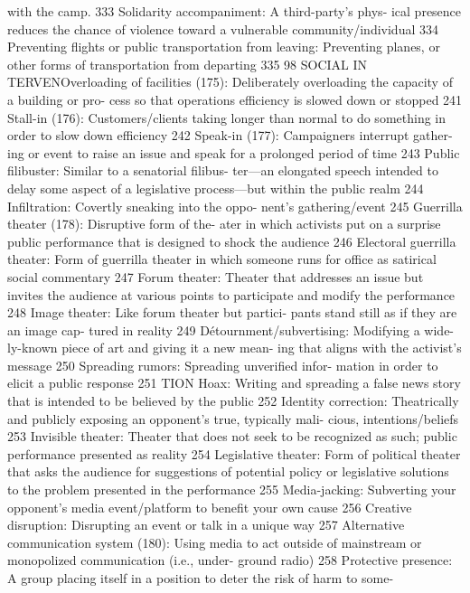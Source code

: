 \documentclass[twoside,a4paper,12pt,fleqn,openany]{extbook}
\begin{document}
with the camp.
 333
Solidarity accompaniment: A third-party’s phys-
ical presence reduces the chance of violence
toward a vulnerable community/individual 334
Preventing flights or public transportation
from leaving: Preventing planes, or other forms
of transportation from departing
 335
98
SOCIAL IN TERVENOverloading of facilities (175): Deliberately
overloading the capacity of a building or pro-
cess so that operations efficiency is slowed
down or stopped
 241
Stall-in (176): Customers/clients taking longer
than normal to do something in order to slow
down efficiency
 242
Speak-in (177): Campaigners interrupt gather-
ing or event to raise an issue and speak for a
prolonged period of time
 243
Public filibuster: Similar to a senatorial filibus-
ter—an elongated speech intended to delay
some aspect of a legislative process—but
within the public realm
 244
Infiltration: Covertly sneaking into the oppo-
nent’s gathering/event
 245
Guerrilla theater (178): Disruptive form of the-
ater in which activists put on a surprise public
performance that is designed to shock the
audience
 246
Electoral guerrilla theater: Form of guerrilla
theater in which someone runs for office as
satirical social commentary
 247
Forum theater: Theater that addresses an issue
but invites the audience at various points to
participate and modify the performance 248
Image theater: Like forum theater but partici-
pants stand still as if they are an image cap-
tured in reality
 249
Détournment/subvertising: Modifying a wide-
ly-known piece of art and giving it a new mean-
ing that aligns with the activist’s message 250
Spreading rumors: Spreading unverified infor-
mation in order to elicit a public response 251
TION
Hoax: Writing and spreading a false news
story that is intended to be believed by the
public
 252
Identity correction: Theatrically and publicly
exposing an opponent’s true, typically mali-
cious, intentions/beliefs
 253
Invisible theater: Theater that does not seek
to be recognized as such; public performance
presented as reality
 254
Legislative theater: Form of political theater
that asks the audience for suggestions of
potential policy or legislative solutions to the
problem presented in the performance 255
Media-jacking: Subverting your opponent’s
media event/platform to benefit your own
cause
 256
Creative disruption: Disrupting an event or talk
in a unique way
 257
Alternative communication system (180):
Using media to act outside of mainstream or
monopolized communication (i.e., under-
ground radio)
 258
Protective presence: A group placing itself in
a position to deter the risk of harm to some-
\end{document}
